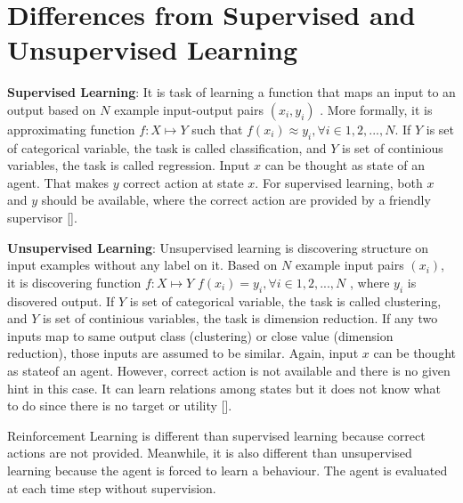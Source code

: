 \section{Differences from Supervised and Unsupervised Learning}
\label{sec:ml}

\textbf{Supervised Learning}: It is task of learning a function that maps an input to an output based on $N$ example input-output pairs $(x_i,y_i)$ \cite{russell_artificial_nodate}. More formally, it is approximating function $f \colon X \mapsto Y$ such that $ f(x_i) \approx y_i, \forall i \in {1,2,...,N} $.
If $Y$ is set of categorical variable, the task is called classification, and $Y$ is set of continious variables, the task is called regression.
Input $x$ can be thought as state of an agent. That makes $y$ correct action at state $x$. For supervised learning, both $x$ and $y$ should be available, where the correct action are provided by a friendly supervisor []. 

\textbf{Unsupervised Learning}: Unsupervised learning is discovering structure on input examples without any label on it. Based on $N$ example input pairs $(x_i)$, it is discovering function $f \colon X \mapsto Y$ $ f(x_i) = y_i, \forall i \in {1,2,...,N} $ , where $y_i$ is disovered output. 
If $Y$ is set of categorical variable, the task is called clustering, and $Y$ is set of continious variables, the task is dimension reduction. If any two inputs map to same output class (clustering) or close value (dimension reduction), those inputs are assumed to be similar.
Again, input $x$ can be thought as stateof an agent. However, correct action is not available and there is no given hint in this case. It can learn relations among states but it does not know what to do since there is no target or utility []. 

Reinforcement Learning is different than supervised learning because correct actions are not provided. Meanwhile, it is also different than unsupervised learning because the agent is forced to learn a behaviour. The agent is evaluated at each time step without supervision.

